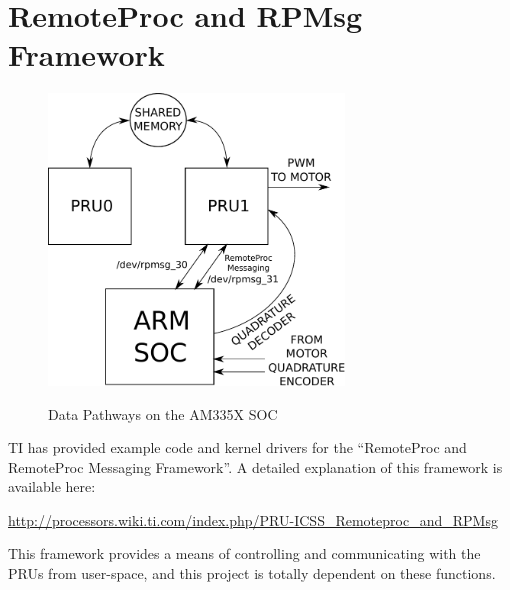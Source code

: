 %
%
%

\chapter{RemoteProc and RPMsg Framework}

\begin{figure}[h]
	\centering
    \includegraphics[width=0.7\textwidth]{diagrams/soc_system}
	\centering\bfseries
	\caption{Data Pathways on the AM335X SOC}
\end{figure}

TI has provided example code and kernel drivers for the ``RemoteProc and RemoteProc Messaging Framework''.  A detailed explanation of this framework is available here:

\url{http://processors.wiki.ti.com/index.php/PRU-ICSS_Remoteproc_and_RPMsg}

This framework provides a means of controlling and communicating with the PRUs from user-space, and this project is totally dependent on these functions.

